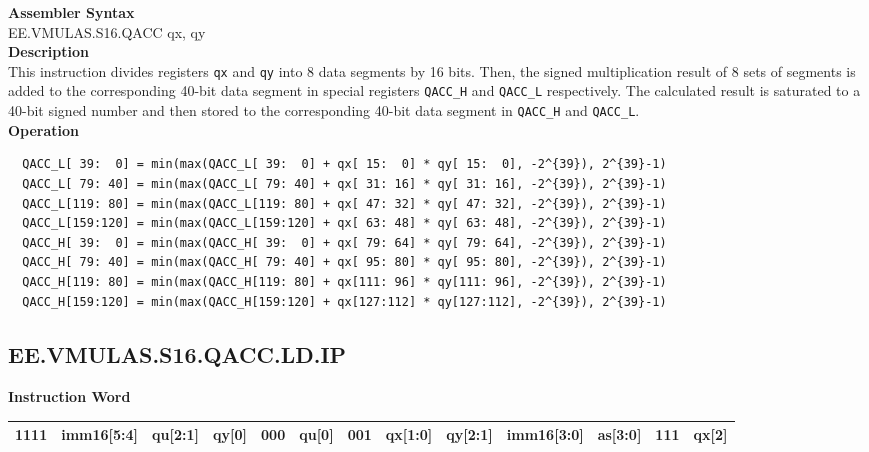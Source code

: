 \textbf{Assembler Syntax} \\
EE.VMULAS.S16.QACC qx, qy \\
\textbf{Description} \\
This instruction divides registers \lstinline{qx} and \lstinline{qy} into 8 data segments by 16 bits. Then, the signed multiplication result of 8 sets of segments is added to the corresponding 40-bit data segment in special registers \lstinline{QACC_H} and \lstinline{QACC_L} respectively. The calculated result is saturated to a 40-bit signed number and then stored to the corresponding 40-bit data segment in \lstinline{QACC_H} and \lstinline{QACC_L}.\\
\textbf{Operation}
\begin{lstlisting}
  QACC_L[ 39:  0] = min(max(QACC_L[ 39:  0] + qx[ 15:  0] * qy[ 15:  0], -2^{39}), 2^{39}-1)
  QACC_L[ 79: 40] = min(max(QACC_L[ 79: 40] + qx[ 31: 16] * qy[ 31: 16], -2^{39}), 2^{39}-1)
  QACC_L[119: 80] = min(max(QACC_L[119: 80] + qx[ 47: 32] * qy[ 47: 32], -2^{39}), 2^{39}-1)
  QACC_L[159:120] = min(max(QACC_L[159:120] + qx[ 63: 48] * qy[ 63: 48], -2^{39}), 2^{39}-1)
  QACC_H[ 39:  0] = min(max(QACC_H[ 39:  0] + qx[ 79: 64] * qy[ 79: 64], -2^{39}), 2^{39}-1)
  QACC_H[ 79: 40] = min(max(QACC_H[ 79: 40] + qx[ 95: 80] * qy[ 95: 80], -2^{39}), 2^{39}-1)
  QACC_H[119: 80] = min(max(QACC_H[119: 80] + qx[111: 96] * qy[111: 96], -2^{39}), 2^{39}-1)
  QACC_H[159:120] = min(max(QACC_H[159:120] + qx[127:112] * qy[127:112], -2^{39}), 2^{39}-1)
\end{lstlisting}

\clearpage
\subsection{EE.VMULAS.S16.QACC.LD.IP}\label{instruction:EEVMULASS16QACCLDIP}
\setlength\tabcolsep{6pt}
\textbf{Instruction Word} \\
\begin{tabular}{|c|c|c|c|c|c|c|c|c|c|c|c|c|}
	\hline
	1111 & imm16[5:4] & qu[2:1] & qy[0] & 000 & qu[0] & 001 & qx[1:0] & qy[2:1] & imm16[3:0] & as[3:0] & 111 & qx[2] \\
	\hline
\end{tabular}

